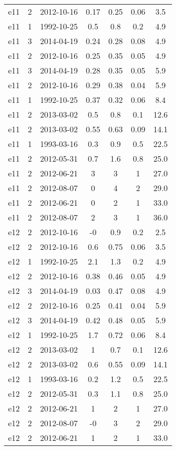 \begin{longtable}{ccccccc}
e11 & 2 & 2012-10-16 & 0.17 & 0.25 & 0.06 & 3.5 \\
e11 & 1 & 1992-10-25 & 0.5 & 0.8 & 0.2 & 4.9 \\
e11 & 3 & 2014-04-19 & 0.24 & 0.28 & 0.08 & 4.9 \\
e11 & 2 & 2012-10-16 & 0.25 & 0.35 & 0.05 & 4.9 \\
e11 & 3 & 2014-04-19 & 0.28 & 0.35 & 0.05 & 5.9 \\
e11 & 2 & 2012-10-16 & 0.29 & 0.38 & 0.04 & 5.9 \\
e11 & 1 & 1992-10-25 & 0.37 & 0.32 & 0.06 & 8.4 \\
e11 & 2 & 2013-03-02 & 0.5 & 0.8 & 0.1 & 12.6 \\
e11 & 2 & 2013-03-02 & 0.55 & 0.63 & 0.09 & 14.1 \\
e11 & 1 & 1993-03-16 & 0.3 & 0.9 & 0.5 & 22.5 \\
e11 & 2 & 2012-05-31 & 0.7 & 1.6 & 0.8 & 25.0 \\
e11 & 2 & 2012-06-21 & 3 & 3 & 1 & 27.0 \\
e11 & 2 & 2012-08-07 & 0 & 4 & 2 & 29.0 \\
e11 & 2 & 2012-06-21 & 0 & 2 & 1 & 33.0 \\
e11 & 2 & 2012-08-07 & 2 & 3 & 1 & 36.0 \\
e12 & 2 & 2012-10-16 & -0 & 0.9 & 0.2 & 2.5 \\
e12 & 2 & 2012-10-16 & 0.6 & 0.75 & 0.06 & 3.5 \\
e12 & 1 & 1992-10-25 & 2.1 & 1.3 & 0.2 & 4.9 \\
e12 & 2 & 2012-10-16 & 0.38 & 0.46 & 0.05 & 4.9 \\
e12 & 3 & 2014-04-19 & 0.03 & 0.47 & 0.08 & 4.9 \\
e12 & 2 & 2012-10-16 & 0.25 & 0.41 & 0.04 & 5.9 \\
e12 & 3 & 2014-04-19 & 0.42 & 0.48 & 0.05 & 5.9 \\
e12 & 1 & 1992-10-25 & 1.7 & 0.72 & 0.06 & 8.4 \\
e12 & 2 & 2013-03-02 & 1 & 0.7 & 0.1 & 12.6 \\
e12 & 2 & 2013-03-02 & 0.6 & 0.55 & 0.09 & 14.1 \\
e12 & 1 & 1993-03-16 & 0.2 & 1.2 & 0.5 & 22.5 \\
e12 & 2 & 2012-05-31 & 0.3 & 1.1 & 0.8 & 25.0 \\
e12 & 2 & 2012-06-21 & 1 & 2 & 1 & 27.0 \\
e12 & 2 & 2012-08-07 & -0 & 3 & 2 & 29.0 \\
e12 & 2 & 2012-06-21 & 1 & 2 & 1 & 33.0 \\

\end{longtable}

